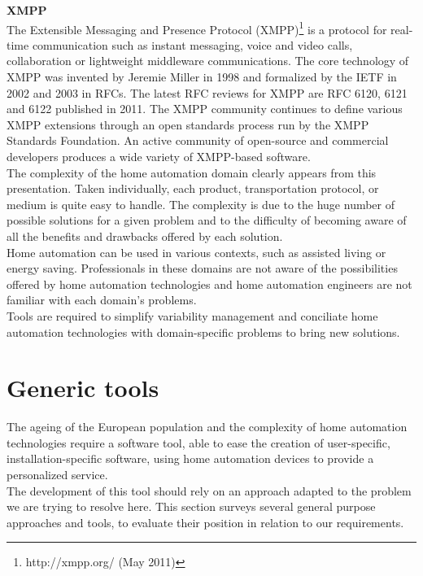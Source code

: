 {\bf XMPP}\\
The Extensible Messaging and Presence Protocol (XMPP)\footnote{http://xmpp.org/ (May 2011)} is a protocol for real-time communication such as instant messaging, voice and video calls, collaboration or lightweight middleware communications.
The core technology of XMPP was invented by Jeremie Miller in 1998 and formalized by the IETF in 2002 and 2003 in RFCs. The latest RFC reviews for XMPP are RFC 6120, 6121 and 6122 published in 2011. The XMPP community continues to define various XMPP extensions through an open standards process run by the XMPP Standards Foundation. An active community of open-source and commercial developers produces a wide variety of XMPP-based software.\\

The complexity of the home automation domain clearly appears from this presentation. Taken individually, each product, transportation protocol, or medium is quite easy to handle. The complexity is due to the huge number of possible solutions for a given problem and to the difficulty of becoming aware of all the benefits and drawbacks offered by each solution.\\
Home automation can be used in various contexts, such as assisted living or energy saving. Professionals in these domains are not aware of the possibilities offered by home automation technologies and home automation engineers are not familiar with each domain's problems.\\
Tools are required to simplify variability management and conciliate home automation technologies with domain-specific problems to bring new solutions.


\newpage
\section{Generic tools}
\label{sec:generalPurposeApproaches}

The ageing of the European population and the complexity of home automation technologies require a software tool, able to ease the creation of user-specific, installation-specific software, using home automation devices to provide a personalized service.\\
The development of this tool should rely on an approach adapted to the problem we are trying to resolve here. This section surveys several general purpose approaches and tools, to evaluate their position in relation to our requirements.\\

